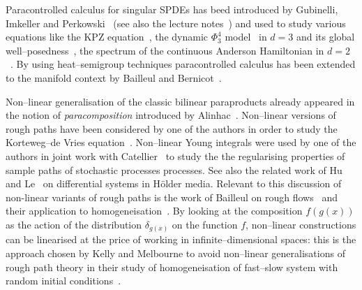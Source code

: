\documentclass[11pt,reqno]{amsart}
\newcommand{\tmtextit}[1]{{\itshape{#1}}}
\begin{document}
Paracontrolled calculus for singular SPDEs has beed introduced by Gubinelli,
Imkeller and Perkowski~{\cite{gubinelli_paracontrolled_2015}} (see also the
lecture notes~{\cite{gubinelli_lectures_2015}}) and used to study various
equations like the KPZ equation~{\cite{gubinelli_kpz_2015}}, the dynamic
$\Phi^4_3$ model~{\cite{catellier_paracontrolled_2013}} in $d = 3$ and its
global well--posedness~{\cite{mourrat_global_2016}}, the spectrum of the
continuous Anderson Hamiltonian in $d = 2$~{\cite{allez_continuous_2015}}. By
using heat--semigroup techniques paracontrolled calculus has been extended to
the manifold context by Bailleul and Bernicot~{\cite{bailleul_heat_2015}}.

Non--linear generalisation of the classic bilinear paraproducts already
appeared in the notion of \tmtextit{paracomposition} introduced by
Alinhac~{\cite{bony_microlocal_1991}}. Non--linear versions of rough paths
have been considered by one of the authors in order to study the Korteweg--de
Vries equation~{\cite{gubinelli_rough_2012}}. Non--linear Young integrals were
used by one of the authors in joint work with
Catellier~{\cite{catellier_averaging_2016}} to study the the regularising
properties of sample paths of stochastic processes processes. See also the
related work of Hu and Le~{\cite{hu_nonlinear_2014}} on differential systems
in H{\"o}lder media. Relevant to this discussion of non-linear variants of
rough paths is the work of Bailleul on rough
flows~{\cite{bailleul_flows_2015}} and their application to
homogeneisation~{\cite{bailleul_rough_2016}}. By looking at the composition $f
(g (x))$ as the action of the distribution $\delta_{g (x)}$ on the function
$f$, non--linear constructions can be linearised at the price of working in
infinite--dimensional spaces: this is the approach chosen by Kelly and
Melbourne to avoid non--linear generalisations of rough path theory in their
study of homogeneisation of fast--slow system with random initial
conditions~{\cite{kelly_deterministic_2014}}.
\end{document}

